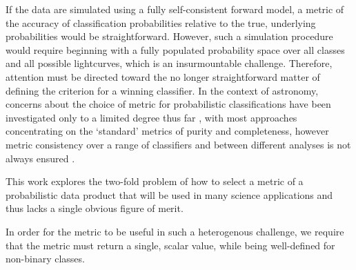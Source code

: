 If the data are simulated using a fully self-consistent forward model, a metric of the accuracy of classification probabilities relative to the true, underlying probabilities would be straightforward.
However, such a simulation procedure would require beginning with a fully populated probability space over all classes and all possible lightcurves, which is an insurmountable challenge.
Therefore, attention must be directed toward the no longer straightforward matter of defining the criterion for a winning classifier.
In the context of astronomy, concerns about the choice of metric for probabilistic classifications have been investigated only to a limited degree thus far \cite{2018SoPh..293...28F, 2017MNRAS.464.4463K}, with most approaches concentrating on the `standard' metrics of purity and completeness, however metric consistency over a range of classifiers and between different analyses is not always ensured \cite{2018A&C....23...15B}.

This work explores the two-fold problem of how to select a metric of a probabilistic data product that will be used in many science applications and thus lacks a single obvious figure of merit.


In order for the metric to be useful in such a heterogenous challenge, we require that the metric must return a single, scalar value, while being well-defined for non-binary classes.

